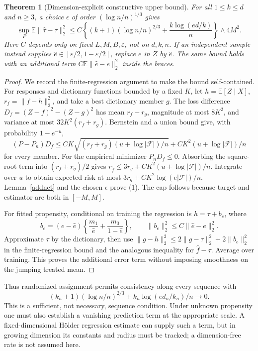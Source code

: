 \documentclass[11pt]{article}
\newtheorem{theorem}{Theorem}
\theoremstyle{remark}
\newcommand{\E}{\mathbb E}
\begin{document}
\begin{theorem}[Dimension-explicit constructive upper bound]\label{upper}
For all $1\leq k\leq d$ and $n\geq3$, a choice $\epsilon$ of order $(\log n/n)^{1/3}$ gives
\[
 \sup_P\E\|\widehat\tau-\tau\|_2^2
 \leq C\left\{(k+1)(\log n/n)^{2/3}
                    +\frac{k\log(ed/k)}n\right\}\wedge4M^2.\tag{1}
\]
Here $C$ depends only on fixed $L,M,B,\varepsilon$, not on $d,k,n$. If an independent sample instead supplies
$\widehat e\in[\varepsilon/2,1-\varepsilon/2]$, replace $e$ in $Z$ by $\widehat e$. The same bound holds with an additional term $C\E\|\widehat e-e\|_2^2$ inside the braces.
\end{theorem}
\begin{proof}
We record the finite-regression argument to make the bound self-contained. For responses and dictionary functions bounded by a fixed $K$, let $h=\E[Z\mid X]$, $r_f=\|f-h\|_2^2$, and take a best dictionary member $g$. The loss difference
$D_f=(Z-f)^2-(Z-g)^2$ has mean $r_f-r_g$, magnitude at most $8K^2$, and variance at most $32K^2(r_f+r_g)$. Bernstein and a union bound give, with probability $1-e^{-u}$,
\[
 (P-P_n)D_f\leq
 C K\sqrt{(r_f+r_g)(u+\log|\mathcal F|)/n}
     +C K^2(u+\log|\mathcal F|)/n
\]
for every member. For the empirical minimizer $P_nD_f\leq0$. Absorbing the square-root term into $(r_f+r_g)/2$ gives
$r_{\widehat f}\leq3r_g+C K^2(u+\log|\mathcal F|)/n$.
Integrate over $u$ to obtain expected risk at most
$3r_g+C K^2\log(e|\mathcal F|)/n$. Lemma~\ref{addnet} and the chosen $\epsilon$ prove (1). The cap follows because target and estimator are both in $[-M,M]$.

For fitted propensity, conditional on training the regression is $h=\tau+b_e$, where
\[
 b_e=(e-\widehat e)\left\{\frac{m_1}{\widehat e}
                         +\frac{m_0}{1-\widehat e}\right\},
 \qquad\|b_e\|_2^2\leq C\|\widehat e-e\|_2^2.
\]
Approximate $\tau$ by the dictionary, then use
$\|g-h\|_2^2\leq2\|g-\tau\|_2^2+2\|b_e\|_2^2$ in the finite-regression bound and the analogous inequality for $\widehat f-\tau$. Average over training. This proves the additional error term without imposing smoothness on the jumping treated mean.
\end{proof}

Thus randomized assignment permits consistency along every sequence with
\[(k_n+1)(\log n/n)^{2/3}+k_n\log(ed_n/k_n)/n\to0.\]
This is a sufficient, not necessary, sequence condition. Under unknown propensity one must also establish a vanishing prediction term at the appropriate scale. A fixed-dimensional H\"older regression estimate can supply such a term, but in growing dimension its constants and radius must be tracked; a dimension-free rate is not assumed here.
\end{document}
